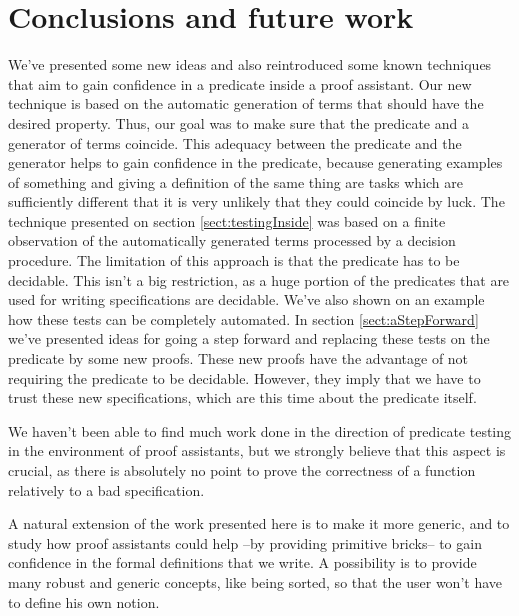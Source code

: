 \section{Conclusions and future work}


We've presented some new ideas and also reintroduced some known techniques that aim to gain confidence in a predicate inside a proof assistant. Our new technique is based on the automatic generation of terms that should have the desired property. Thus, our goal was to make sure that the predicate and a generator of terms coincide. This adequacy between the predicate and the generator helps to gain confidence in the predicate, because generating examples of something and giving a definition of the same thing are tasks which are sufficiently different that it is very unlikely that they could coincide by luck. The technique presented on section \ref{sect:testingInside} was based on a finite observation of the automatically generated terms processed by a decision procedure. The limitation of this approach is that the predicate has to be decidable. This isn't a big restriction, as a huge portion of the predicates that are used for writing specifications are decidable. We've also shown on an example how these tests can be completely automated. In section \ref{sect:aStepForward} we've presented ideas for going a step forward and replacing these tests on the predicate by some new proofs. These new proofs have the advantage of not requiring the predicate to be decidable. However, they imply that we have to trust these new specifications, which are this time about the predicate itself.

We haven't been able to find much work done in the direction of predicate testing in the environment of proof assistants, but we strongly believe that this aspect is crucial, as there is absolutely no point to prove the correctness of a function relatively to a bad specification. 

A natural extension of the work presented here is to make it more generic, and to study how proof assistants could help --by providing primitive bricks-- to gain confidence in the formal definitions that we write. A possibility is to provide many robust and generic concepts, like being sorted, so that the user won't have to define his own notion. 